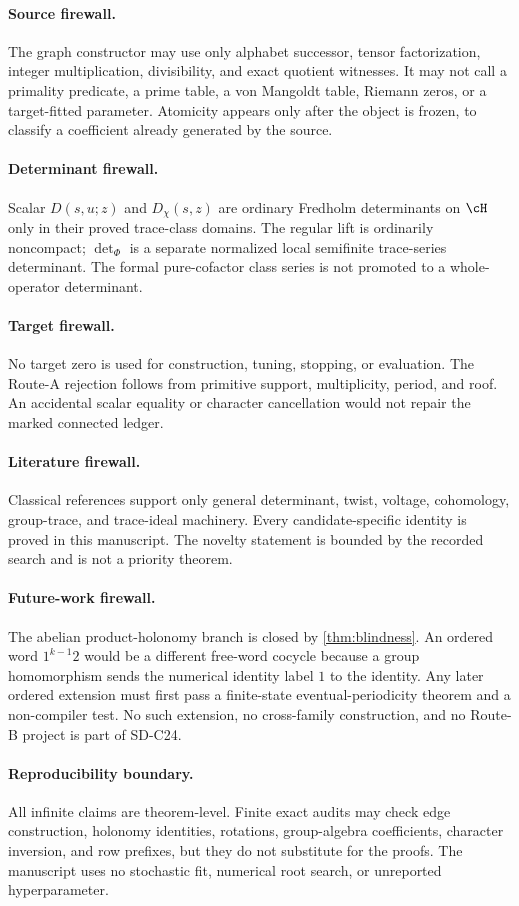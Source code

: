 \paragraph{Source firewall.}
The graph constructor may use only alphabet successor, tensor factorization,
integer multiplication, divisibility, and exact quotient witnesses.  It may
not call a primality predicate, a prime table, a von Mangoldt table, Riemann
zeros, or a target-fitted parameter.  Atomicity appears only after the object
is frozen, to classify a coefficient already generated by the source.

\paragraph{Determinant firewall.}
Scalar \(D(s,u;z)\) and \(D_\chi(s,z)\) are ordinary Fredholm determinants on
\(\cH\) only in their proved trace-class domains.  The regular lift is
ordinarily noncompact; \(\det_\Phi\) is a separate normalized local
semifinite trace-series determinant.  The formal pure-cofactor class series
is not promoted to a whole-operator determinant.

\paragraph{Target firewall.}
No target zero is used for construction, tuning, stopping, or evaluation.
The Route-A rejection follows from primitive support, multiplicity, period,
and roof.  An accidental scalar equality or character cancellation would not
repair the marked connected ledger.

\paragraph{Literature firewall.}
Classical references support only general determinant, twist, voltage,
cohomology, group-trace, and trace-ideal machinery.  Every candidate-specific
identity is proved in this manuscript.  The novelty statement is bounded by
the recorded search and is not a priority theorem.

\paragraph{Future-work firewall.}
The abelian product-holonomy branch is closed by
\cref{thm:blindness}.  An ordered word \(1^{k-1}2\) would be a different
free-word cocycle because a group homomorphism sends the numerical identity
label \(1\) to the identity.  Any later ordered extension must first pass a
finite-state eventual-periodicity theorem and a non-compiler test.  No such
extension, no cross-family construction, and no Route-B project is part of
SD-C24.

\paragraph{Reproducibility boundary.}
All infinite claims are theorem-level.  Finite exact audits may check edge
construction, holonomy identities, rotations, group-algebra coefficients,
character inversion, and row prefixes, but they do not substitute for the
proofs.  The manuscript uses no stochastic fit, numerical root search, or
unreported hyperparameter.
